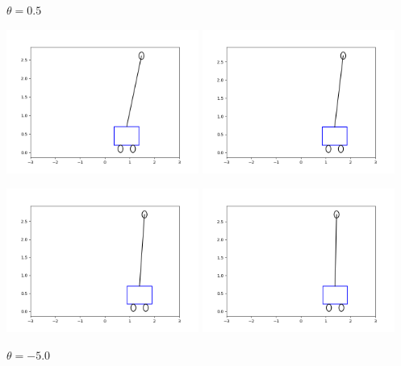 \documentclass[12pt,fleqn]{article}\usepackage{../../common}
\begin{document}
$\theta = 0.5$

\includegraphics[width=17em]{frames1/cart-0005.png}
\includegraphics[width=17em]{frames1/cart-0015.png}

\includegraphics[width=17em]{frames1/cart-0020.png}
\includegraphics[width=17em]{frames1/cart-0030.png}

$\theta = -5.0$
\end{document}
